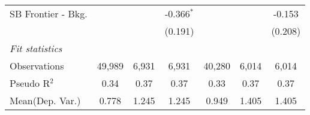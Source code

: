 \begin{tabular}{lcccccc}
   SB Frontier - Bkg.   &                &               & -0.366$^{*}$   &                &               & -0.153\\   
                        &                &               & (0.191)        &                &               & (0.208)\\   
   \midrule
   \emph{Fit statistics}\\
   Observations         & 49,989         & 6,931         & 6,931          & 40,280         & 6,014         & 6,014\\  
   Pseudo R$^2$         & 0.34           & 0.37          & 0.37           & 0.33           & 0.37          & 0.37\\  
Mean(Dep. Var.) & 0.778 & 1.245 & 1.245 & 0.949 & 1.405 & 1.405 \\
   

\end{tabular}
